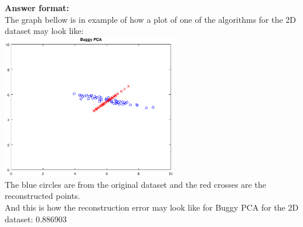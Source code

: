 \documentclass[a4paper]{article}
\newcounter{thm}
\theoremstyle{definition}
\begin{document}
\textbf{Answer format:}  \\
The graph bellow is in example of how a plot of one of the algorithms for the 2D dataset may look like: \\
\includegraphics[width=3in]{buggy_pca} \hspace{0.4in}
\\

The blue circles are from the original dataset and the red crosses are the reconstructed points. \\

And this is how the reconstruction error may look like for Buggy PCA for the 2D dataset: 0.886903








\end{document}
